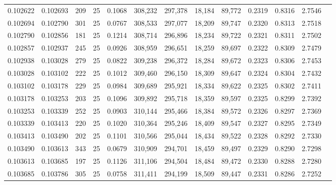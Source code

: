 \begin{tabular}{rrrrrrrrrrrrr}
0.102622 & 0.102693 &   209 &  25 &                                     0.1068 & 308,232 & 297,378 &  18,184 &  89,772 & 0.2319 & 0.8316 & 2.7546 \\
0.102694 & 0.102790 &   301 &  25 &                                     0.0767 & 308,533 & 297,077 &  18,209 &  89,747 & 0.2320 & 0.8313 & 2.7518 \\
0.102790 & 0.102856 &   181 &  25 &                                     0.1214 & 308,714 & 296,896 &  18,234 &  89,722 & 0.2321 & 0.8311 & 2.7502 \\
0.102857 & 0.102937 &   245 &  25 &                                     0.0926 & 308,959 & 296,651 &  18,259 &  89,697 & 0.2322 & 0.8309 & 2.7479 \\
0.102938 & 0.103028 &   279 &  25 &                                     0.0822 & 309,238 & 296,372 &  18,284 &  89,672 & 0.2323 & 0.8306 & 2.7453 \\
0.103028 & 0.103102 &   222 &  25 &                                     0.1012 & 309,460 & 296,150 &  18,309 &  89,647 & 0.2324 & 0.8304 & 2.7432 \\
0.103102 & 0.103178 &   229 &  25 &                                     0.0984 & 309,689 & 295,921 &  18,334 &  89,622 & 0.2325 & 0.8302 & 2.7411 \\
0.103178 & 0.103253 &   203 &  25 &                                     0.1096 & 309,892 & 295,718 &  18,359 &  89,597 & 0.2325 & 0.8299 & 2.7392 \\
0.103253 & 0.103339 &   252 &  25 &                                     0.0903 & 310,144 & 295,466 &  18,384 &  89,572 & 0.2326 & 0.8297 & 2.7369 \\
0.103339 & 0.103413 &   220 &  25 &                                     0.1020 & 310,364 & 295,246 &  18,409 &  89,547 & 0.2327 & 0.8295 & 2.7349 \\
0.103413 & 0.103490 &   202 &  25 &                                     0.1101 & 310,566 & 295,044 &  18,434 &  89,522 & 0.2328 & 0.8292 & 2.7330 \\
0.103490 & 0.103613 &   343 &  25 &                                     0.0679 & 310,909 & 294,701 &  18,459 &  89,497 & 0.2329 & 0.8290 & 2.7298 \\
0.103613 & 0.103685 &   197 &  25 &                                     0.1126 & 311,106 & 294,504 &  18,484 &  89,472 & 0.2330 & 0.8288 & 2.7280 \\
0.103685 & 0.103786 &   305 &  25 &                                     0.0758 & 311,411 & 294,199 &  18,509 &  89,447 & 0.2331 & 0.8286 & 2.7252 \\

\end{tabular}
